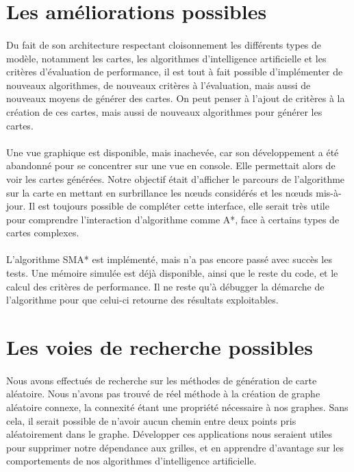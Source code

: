 \documentclass[pidr]{tnreport}
\begin{document}
\section{Les améliorations possibles}
\paragraph{}
Du fait de son architecture respectant cloisonnement les différents types de modèle, notamment les cartes, les algorithmes d'intelligence artificielle et les critères d'évaluation de performance, il est tout à fait possible d'implémenter de nouveaux algorithmes, de nouveaux critères à l'évaluation, mais aussi de nouveaux moyens de générer des cartes. On peut penser à l'ajout de critères à la création de ces cartes, mais aussi de nouveaux algorithmes pour générer les cartes. 

\paragraph{}
Une vue graphique est disponible, mais inachevée, car son développement a été abandonné pour se concentrer sur une vue en console. Elle permettait alors de voir les cartes générées. Notre objectif était d'afficher le parcours de l'algorithme sur la carte en mettant en surbrillance les nœuds considérés et les nœuds mis-à-jour. Il est toujours possible de compléter cette interface, elle serait très utile pour comprendre l'interaction d'algorithme comme A*, face à certains types de cartes complexes. 

\paragraph{}
L'algorithme SMA* est implémenté, mais n'a pas encore passé avec succès les tests. Une mémoire simulée est déjà disponible, ainsi que le reste du code, et le calcul des critères de performance. Il ne reste qu'à débugger la démarche de l'algorithme pour que celui-ci retourne des résultats exploitables.  

\section{Les voies de recherche possibles}
\paragraph{}
Nous avons effectués de recherche sur les méthodes de génération de carte aléatoire. Nous n'avons pas trouvé de réel méthode à la création de graphe aléatoire connexe, la connexité étant une propriété nécessaire à nos graphes. Sans cela, il serait possible de n'avoir aucun chemin entre deux points pris aléatoirement dans le graphe. Développer ces applications nous seraient utiles pour supprimer notre dépendance aux grilles, et en apprendre d'avantage sur les comportements de nos algorithmes d'intelligence artificielle.
\end{document}
